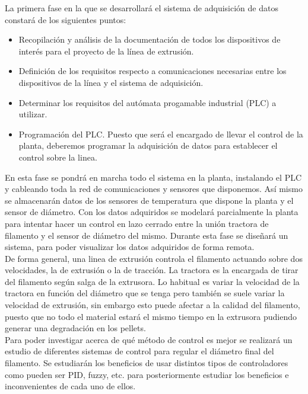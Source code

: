 La primera fase en la que se desarrollará el sistema de adquisición de datos constará de los siguientes puntos:

\begin{itemize}
    \item Recopilación y análisis de la documentación de todos los dispositivos de interés para el proyecto de la línea de extrusión.
    \item Definición de los requisitos respecto a comunicaciones necesarias entre los dispositivos de la línea y el sistema de adquisición.
    \item Determinar los requisitos del autómata progamable industrial (PLC) a utilizar.
    \item Programación del PLC. Puesto que será el encargado de llevar el control de la planta, deberemos programar la adquisición de datos para establecer el control sobre la linea.
\end{itemize}

En esta fase se pondrá en marcha todo el sistema en la planta, instalando el PLC y cableando toda la red de comunicaciones y sensores que disponemos. Así mismo se almacenarán datos de los sensores de temperatura que dispone la planta y el sensor de diámetro. Con los datos adquiridos se modelará parcialmente la planta para intentar hacer un control en lazo cerrado entre la unión tractora de filamento y el sensor de diámetro del mismo. Durante esta fase se diseñará un sistema, para poder visualizar los datos adquiridos de forma remota.\\

De forma general, una linea de extrusión controla el filamento actuando sobre dos velocidades, la de extrusión o la de tracción. La tractora es la encargada de tirar del filamento según salga de la extrusora. Lo habitual es variar la velocidad de la tractora en función del diámetro que se tenga pero también se suele variar la velocidad de extrusión, sin embargo esto puede afectar a la calidad del filamento, puesto que no todo el material estará el mismo tiempo en la extrusora pudiendo generar una degradación en los pellets.\\

Para poder investigar acerca de qué método de control es mejor se realizará un estudio de diferentes sistemas de control para regular el diámetro final del filamento. Se estudiarán los beneficios de usar distintos tipos de controladores como pueden ser PID, fuzzy, etc. para posteriormente estudiar los beneficios e inconvenientes de cada uno de ellos.\\

